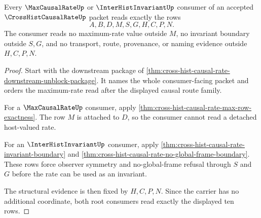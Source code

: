 \begin{theorem}
\label{thm:cross-hist-causal-rate-root-consumer-exactness}
Every $\MaxCausalRateUp$ or $\InterHistInvariantUp$ consumer of an accepted $\CrossHistCausalRateUp$ packet reads exactly the rows
$$
A,B,D,M,S,G,H,C,P,N.
$$
The consumer reads no maximum-rate value outside $M$, no invariant boundary outside $S,G$, and no transport, route, provenance, or naming evidence outside $H,C,P,N$.
\end{theorem}
\begin{proof}
Start with the downstream package of \autoref{thm:cross-hist-causal-rate-downstream-unblock-package}. It names the whole consumer-facing packet and orders the maximum-rate read after the displayed causal route family.

For a $\MaxCausalRateUp$ consumer, apply \autoref{thm:cross-hist-causal-rate-max-row-exactness}. The row $M$ is attached to $D$, so the consumer cannot read a detached host-valued rate.

For an $\InterHistInvariantUp$ consumer, apply \autoref{thm:cross-hist-causal-rate-invariant-boundary} and \autoref{thm:cross-hist-causal-rate-no-global-frame-boundary}. These rows force observer symmetry and no-global-frame refusal through $S$ and $G$ before the rate can be used as an invariant.

The structural evidence is then fixed by $H,C,P,N$. Since the carrier has no additional coordinate, both root consumers read exactly the displayed ten rows.
\end{proof}

